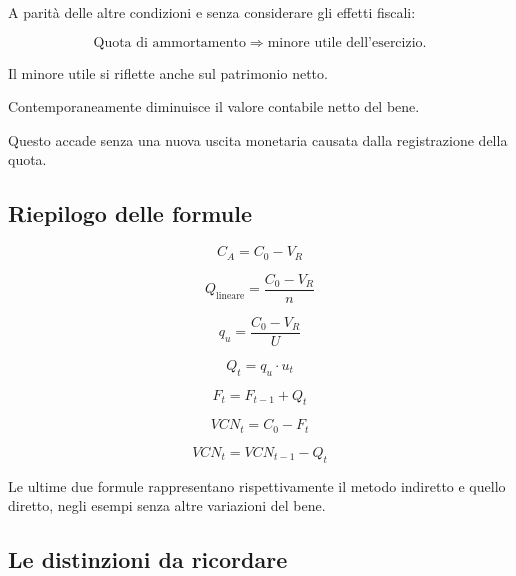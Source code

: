 \noindent A parità delle altre condizioni
e senza considerare gli effetti fiscali:

\[
\text{Quota di ammortamento}
\Rightarrow
\text{minore utile dell'esercizio}.
\]

\noindent Il minore utile
si riflette anche sul patrimonio netto.

\noindent Contemporaneamente diminuisce
il valore contabile netto del bene.

\noindent Questo accade senza
una nuova uscita monetaria
causata dalla registrazione della quota.


\subsection{Riepilogo delle formule}

\[
\boxed{
C_A=C_0-V_R
}
\]

\[
\boxed{
Q_{\text{lineare}}
=
\frac{C_0-V_R}{n}
}
\]

\[
\boxed{
q_u=\frac{C_0-V_R}{U}
}
\]

\[
\boxed{
Q_t=q_u\cdot u_t
}
\]

\[
\boxed{
F_t=F_{t-1}+Q_t
}
\]

\[
\boxed{
VCN_t=C_0-F_t
}
\]

\[
\boxed{
VCN_t=VCN_{t-1}-Q_t
}
\]

\noindent Le ultime due formule
rappresentano rispettivamente
il metodo indiretto e quello diretto,
negli esempi senza altre variazioni del bene.


\subsection{Le distinzioni da ricordare}

